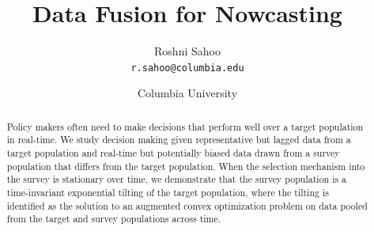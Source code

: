 \documentclass{article}
\author{Roshni Sahoo\\
  \texttt{r.sahoo@columbia.edu}}
\title{Data Fusion for Nowcasting}
\date{Columbia University}
\theoremstyle{definition}
\theoremstyle{plain}
\theoremstyle{remark}
\begin{document}
\maketitle

\begin{abstract}
Policy makers often need to make decisions that perform well over a target population in real-time. We study decision making given representative but lagged data from a target population and real-time but potentially biased data drawn from a survey population that differs from the target population. When the selection mechanism into the survey is stationary over time, we demonstrate that the survey population is a time-invariant exponential tilting of the target population, where the tilting is identified as the solution to an augmented convex optimization problem on data pooled from the target and survey populations across time.
\end{abstract}






\end{document}
